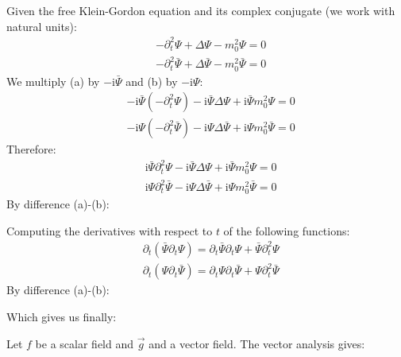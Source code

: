 	Given the free Klein-Gordon equation and its complex conjugate (we work with natural units):
	\begin{subequations}
	\label{equations}
	\begin{align}
	  \label{eq:a}
	  &-\partial_t^2\Psi+\Delta \Psi-m_0^2\Psi=0 \\
	  \label{eq:b}
	  &-\partial_t^2\bar{\Psi}+\Delta \bar{\Psi}-m_0^2\bar{\Psi}=0
	\end{align}
	\end{subequations}
	We multiply (a) by $-\mathrm{i}\bar{\Psi}$ and (b) by $-\mathrm{i}\Psi$:
	\begin{subequations}
	\label{equations}
	\begin{align}
	  \label{eq:a}
	  &-\mathrm{i}\bar{\Psi}\left(-\partial_t^2\Psi\right)-\mathrm{i}\bar{\Psi}\Delta \Psi+\mathrm{i}\bar{\Psi}m_0^2\Psi=0 \\
	  \label{eq:b}
	  &-\mathrm{i}\Psi\left(-\partial_t^2\bar{\Psi}\right)-\mathrm{i}\Psi\Delta \bar{\Psi}+\mathrm{i}\Psi m_0^2\bar{\Psi}=0
	\end{align}
	\end{subequations}
	Therefore:
	\begin{subequations}
	\label{equations}
	\begin{align}
	  \label{eq:a}
	  &\mathrm{i}\bar{\Psi}\partial_t^2\Psi-\mathrm{i}\bar{\Psi}\Delta \Psi+\mathrm{i}\bar{\Psi}m_0^2\Psi=0 \\
	  \label{eq:b}
	  &\mathrm{i}\Psi\partial_t^2\bar{\Psi}-\mathrm{i}\Psi\Delta \bar{\Psi}+\mathrm{i}\Psi m_0^2\bar{\Psi}=0
	\end{align}
	\end{subequations}
	By difference (a)-(b):
	
	Computing the derivatives with respect to $t$ of the following functions:
	\begin{subequations}
	\label{equations}
	\begin{align}
	  \label{eq:a}
	  &\partial_t(\bar{\Psi}\partial_t\Psi)=\partial_t\bar{\Psi}\partial_t\Psi+\bar{\Psi}\partial_t^2\Psi \\
	  \label{eq:b}
	  &\partial_t(\Psi\partial_t\bar{\Psi})=\partial_t\Psi\partial_t\bar{\Psi}+\Psi\partial_t^2\bar{\Psi}
	\end{align}
	\end{subequations}
	By difference (a)-(b):
	
	Which gives us finally:
	
	Let $f$ be a scalar field and $\vec{g}$ and a vector field. The vector analysis gives:
	
